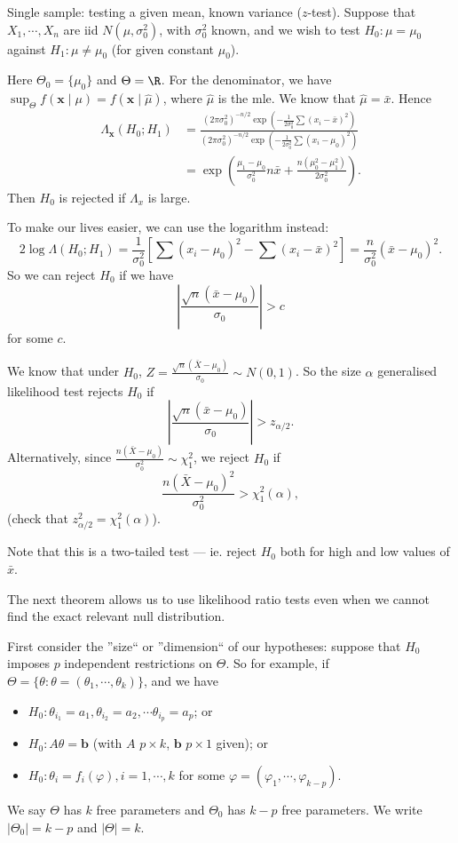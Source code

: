 \documentclass[a4paper]{article}
\begin{document}
\begin{eg}
  Single sample: testing a given mean, known variance ($z$-test). Suppose that $X_1, \cdots, X_n$ are iid $N(\mu, \sigma_0^2)$, with $\sigma_0^2$ known, and we wish to test $H_0: \mu = \mu_0$ against $H_1: \mu \not= \mu_0$ (for given constant $\mu_0$).

  Here $\Theta_0 = \{\mu_0\}$ and $\Theta = \R$.
  For the denominator, we have $\sup_\Theta f(\mathbf{x}\mid \mu) = f(\mathbf{x}\mid \hat{\mu})$, where $\hat{\mu}$ is the mle. We know that $\hat{\mu} = \bar x$. Hence
  \begin{align*}
    \Lambda_\mathbf{x}(H_0; H_1) &= \frac{(2\pi\sigma_0^2)^{-n/2}\exp\left(-\frac{1}{2\sigma^2_0}\sum(x_i - \bar x)^2\right)}{(2\pi\sigma_0^2)^{-n/2}\exp\left(-\frac{1}{2\sigma^2_0}\sum(x_i - \mu_0)^2\right)}\\
    &= \exp\left(\frac{\mu_1 - \mu_0}{\sigma_0^2}n\bar x + \frac{n(\mu_0^2 - \mu_1^2)}{2\sigma_0^2}\right).
  \end{align*}
  Then $H_0$ is rejected if $\Lambda_x$ is large.

  To make our lives easier, we can use the logarithm instead:
  \[
    2\log \Lambda(H_0;H_1) = \frac{1}{\sigma_0^2}\left[\sum (x_i - \mu_0)^2 - \sum (x_i - \bar x)^2\right] = \frac{n}{\sigma_0^2}(\bar x - \mu_0)^2.
  \]
  So we can reject $H_0$ if we have
  \[
    \left|\frac{\sqrt{n}(\bar x - \mu_0)}{\sigma_0}\right| > c
  \]
  for some $c$.

  We know that under $H_0$, $\displaystyle Z = \frac{\sqrt{n}(\bar X - \mu_0)}{\sigma_0}\sim N(0, 1)$. So the size $\alpha$ generalised likelihood test rejects $H_0$ if
  \[
    \left|\frac{\sqrt{n}(\bar x - \mu_0)}{\sigma_0}\right| > z_{\alpha/2}.
  \]
  Alternatively, since $\displaystyle \frac{n(\bar X - \mu_0)}{\sigma_0^2}\sim \chi_1^2$, we reject $H_0$ if
  \[
    \frac{n(\bar X - \mu_0)^2}{\sigma_0^2} > \chi_1^2(\alpha),
  \]
  (check that $z_{\alpha/2}^2 = \chi_1^2(\alpha)$).

  Note that this is a two-tailed test --- ie. reject $H_0$ both for high and low values of $\bar x$.
\end{eg}

The next theorem allows us to use likelihood ratio tests even when we cannot find the exact relevant null distribution.

First consider the ''size`` or ''dimension`` of our hypotheses: suppose that $H_0$ imposes $p$ independent restrictions on $\Theta$. So for example, if $\Theta = \{\theta: \theta = (\theta_1, \cdots, \theta_k)\}$, and we have
\begin{itemize}
  \item $H_0: \theta_{i_1} = a_1, \theta_{i_2} = a_2, \cdots \theta_{i_p} = a_p$; or
  \item $H_0: A\theta = \mathbf{b}$ (with $A$ $p\times k$, $\mathbf{b}$ $p\times 1$ given); or
  \item $H_0: \theta_i = f_i(\varphi), i = 1, \cdots, k$ for some $\varphi = (\varphi_1, \cdots, \varphi_{k - p})$.
\end{itemize}
We say $\Theta$ has $k$ free parameters and $\Theta_0$ has $k - p$ free parameters. We write $|\Theta_0| = k - p$ and $|\Theta| = k$.
\end{document}

